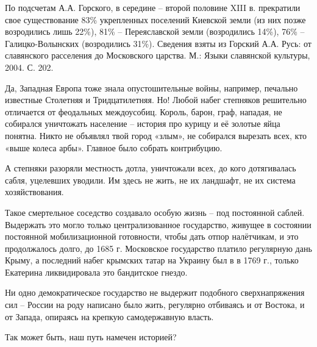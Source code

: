 По подсчетам А.А. Горского, в середине – второй половине XIII в. прекратили
свое существование 83\% укрепленных поселений Киевской земли (из них позже
возродились лишь 22\%), 81\% – Переяславской земли (возродились 14\%), 76\% –
Галицко-Волынских (возродились 31\%). Сведения взяты из Горский А.А. Русь: от
славянского расселения до Московского царства. М.: Языки славянской культуры,
2004. С. 202.

Да, Западная Европа тоже знала опустошительные войны, например, печально
известные Столетняя и Тридцатилетняя. Но! Любой набег степняков решительно
отличается от феодальных междоусобиц. Король, барон, граф, нападая, не
собирался уничтожать население – история про курицу и её золотые яйца понятна.
Никто не объявлял твой город «злым», не собирался вырезать всех, кто «выше
колеса арбы». Главное было собрать контрибуцию.

А степняки разоряли местность дотла, уничтожали всех, до кого дотягивалась
сабля, уцелевших уводили. Им здесь не жить, не их ландшафт, не их система
хозяйствования.

Такое смертельное соседство создавало особую жизнь – под постоянной саблей.
Выдержать это могло только централизованное государство, живущее в состоянии
постоянной мобилизационной готовности, чтобы дать отпор налётчикам, и это
продолжалось долго, до 1685 г. Московское государство платило регулярную дань
Крыму, а последний набег крымских татар на Украину был в в 1769 г., только
Екатерина ликвидировала это бандитское гнездо.

Ни одно демократическое государство не выдержит подобного сверхнапряжения сил –
России на роду написано было жить, регулярно отбиваясь и от Востока, и от
Запада, опираясь на крепкую самодержавную власть.

Так может быть, наш путь намечен историей?
